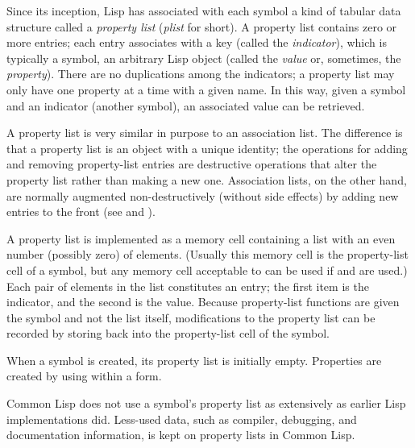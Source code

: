 Since its inception, Lisp has associated with each symbol
a kind of tabular data structure
called a {\it property list} ({\it plist} for short).  A property list contains
zero or more entries; each entry associates with a key
(called the {\it indicator}), which is typically
a symbol, an arbitrary Lisp object (called the {\it value} or,
sometimes, the {\it property}).
There are no duplications among the indicators; a property list may only
have one property at a time with a given name.  In this way, given
a symbol and an indicator (another symbol), an associated value can be
retrieved.

A property
list is very similar in purpose to an association list.  The difference
is that a property list is an object with a unique identity; the
operations for adding and removing property-list entries are destructive
operations that alter the property list rather than making a new one.
Association lists, on the other hand, are normally augmented
non-destructively (without side effects) by adding new entries to the
front (see  and ).

A property list is implemented as a memory cell
containing a list with an even number (possibly zero) of elements.
(Usually this memory cell is the property-list cell of a symbol,
but any memory cell acceptable to  can be used
if  and  are used.)
Each pair of elements in the list constitutes an entry;
the first item is the indicator, and the second is the
value.  Because property-list functions are given the symbol
and not the list itself, modifications to the property list
can be recorded by storing back into the property-list cell of the symbol.

When a symbol is created, its property list is initially empty.
Properties are created by using  within a  form.

Common Lisp does not use a symbol's property list as extensively as earlier
Lisp implementations did.  Less-used data, such as compiler,
debugging, and documentation information, is kept on property lists
in Common Lisp.

